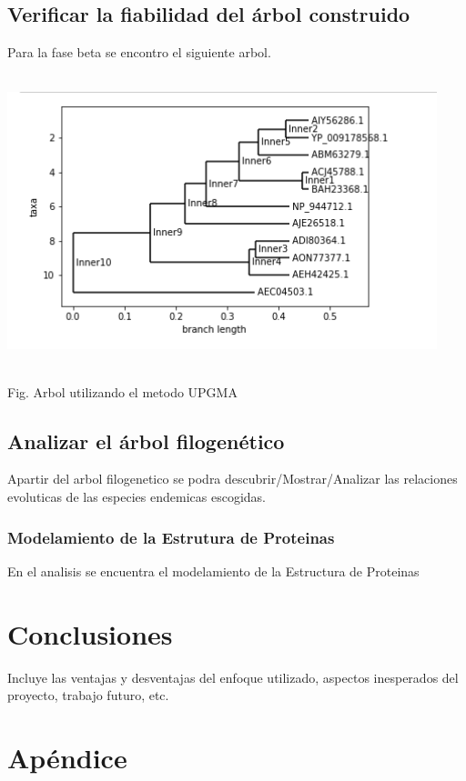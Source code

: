 \documentclass[a4paper]{article}
\begin{document}
\subsection{Verificar la fiabilidad del árbol construido}
Para la fase beta se encontro el siguiente arbol.

\begin{center}
	\includegraphics[width=12.5cm,height=8.5cm]{arbol.png}
	
	Fig. Arbol utilizando el metodo UPGMA
\end{center}

\subsection{Analizar el árbol filogenético}
Apartir del arbol filogenetico se podra descubrir/Mostrar/Analizar las relaciones evoluticas de las especies endemicas escogidas.
\subsubsection{Modelamiento de la Estrutura de Proteinas}
En el analisis se encuentra el modelamiento de la Estructura de Proteinas

\section{Conclusiones}
Incluye las ventajas y desventajas del enfoque utilizado, aspectos inesperados del proyecto, trabajo futuro, etc.
\section{Apéndice}
\end{document}
